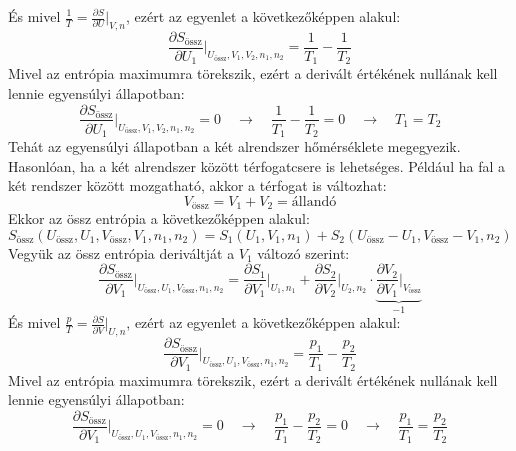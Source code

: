 \documentclass[a4paper,12pt]{article}
\begin{document}
És mivel $\frac{1}{T} = \frac{\partial S}{\partial U}\bigg|_{V,n}$, ezért az egyenlet a következőképpen alakul:
\begin{equation}
    \frac{\partial S_{\text{össz}}}{\partial U_1}\bigg|_{U_{\text{össz}}, V_1, V_2, n_1, n_2} = \frac{1}{T_1} - \frac{1}{T_2}
\end{equation}
Mivel az entrópia maximumra törekszik, ezért a derivált értékének nullának kell lennie egyensúlyi állapotban:
\begin{equation}
    \frac{\partial S_{\text{össz}}}{\partial U_1}\bigg|_{U_{\text{össz}}, V_1, V_2, n_1, n_2} = 0 \quad \to \quad \frac{1}{T_1} - \frac{1}{T_2} = 0 \quad \to \quad T_1 = T_2
\end{equation}
Tehát az egyensúlyi állapotban a két alrendszer hőmérséklete megegyezik. 
\newline
\newline
Hasonlóan, ha a két alrendszer között térfogatcsere is lehetséges. Például ha fal a két rendszer között mozgatható, akkor a térfogat is változhat:
\begin{equation}
    V_{\text{össz}} = V_1 + V_2 = \text{állandó}
\end{equation}
Ekkor az össz entrópia a következőképpen alakul:
\begin{equation}
    S_{\text{össz}} (U_{\text{össz}}, U_1, V_{\text{össz}}, V_1, n_1, n_2) = S_1(U_1, V_1, n_1) + S_2(U_{\text{össz}} - U_1, V_{\text{össz}} - V_1, n_2)
\end{equation}
Vegyük az össz entrópia deriváltját a $V_1$ változó szerint:
\begin{equation}
    \frac{\partial S_{\text{össz}}}{\partial V_1}\bigg|_{U_{\text{össz}}, U_1, V_{\text{össz}}, n_1, n_2} = \frac{\partial S_1}{\partial V_1}\bigg|_{U_1, n_1} + \frac{\partial S_2}{\partial V_2}\bigg|_{U_2, n_2} \cdot \underbrace{\frac{\partial V_2}{\partial V_1}\bigg|_{V_{\text{össz}}}}_{-1}
\end{equation}
És mivel $\frac{p}{T} = \frac{\partial S}{\partial V}\bigg|_{U,n}$, ezért az egyenlet a következőképpen alakul:
\begin{equation}
    \frac{\partial S_{\text{össz}}}{\partial V_1}\bigg|_{U_{\text{össz}}, U_1, V_{\text{össz}}, n_1, n_2} = \frac{p_1}{T_1} - \frac{p_2}{T_2}
\end{equation}
Mivel az entrópia maximumra törekszik, ezért a derivált értékének nullának kell lennie egyensúlyi állapotban:
\begin{equation}
    \frac{\partial S_{\text{össz}}}{\partial V_1}\bigg|_{U_{\text{össz}}, U_1, V_{\text{össz}}, n_1, n_2} = 0 \quad \to \quad \frac{p_1}{T_1} - \frac{p_2}{T_2} = 0 \quad \to \quad \frac{p_1}{T_1} = \frac{p_2}{T_2}
\end{equation}
\end{document}
